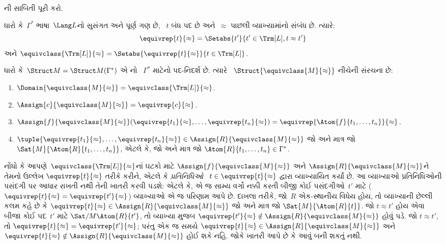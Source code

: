 
\begin{prob}
ની સાબિતી પૂરી કરો.
\end{prob}

\begin{defn}
ધારો કે~$\Gamma^*$ ભાષા~$\Lang L$નો સુસંગત અને પૂર્ણ ગણ છે,
~$t$ બંધ પદ છે અને~$\approx$ પાછલી વ્યાખ્યામાંનો સંબંધ છે. ત્યારે:
\[
\equivrep{t}{\approx}=\Setabs{t'}{t'\in\Trm[L],t\approx t'}
\]
અને
$\equivclass{\Trm[L]}{\approx}=\Setabs{\equivrep{t}{\approx}}{t\in\Trm[L]}$.
\end{defn}

\begin{defn}
ધારો કે~$\Struct M=\Struct M(\Gamma^*)$ એ નો
~$\Gamma^*$ માટેનો પદ-નિદર્શ છે. ત્યારે
~$\Struct{\equivclass{M}{\approx}}$ નીચેની સંરચના છે:
\begin{enumerate}
\item $\Domain{\equivclass{M}{\approx}}=\equivclass{\Trm[L]}{\approx}$.
\item $\Assign{c}{\equivclass{M}{\approx}}=\equivrep{c}{\approx}$.
\item $\Assign{f}{\equivclass{M}{\approx}}(\equivrep{t_1}{\approx},\dots,
  \equivrep{t_n}{\approx})=\equivrep{\Atom{f}{t_1,\dots,t_n}}{\approx}$.
\item $\tuple{\equivrep{t_1}{\approx},\dots,\equivrep{t_n}{\approx}}
  \in\Assign{R}{\equivclass{M}{\approx}}$ જો અને માત્ર જો
  $\Sat{M}{\Atom{R}{t_1,\dots,t_n}}$, એટલે કે, જો અને માત્ર જો
  $\Atom{R}{t_1,\dots,t_n}\in\Gamma^*$.
\end{enumerate}
\end{defn}

\begin{explain}
નોંધો કે આપણે~$\equivclass{\Trm[L]}{\approx}$નાં ઘટકો માટે
$\Assign{f}{\equivclass{M}{\approx}}$ અને
$\Assign{R}{\equivclass{M}{\approx}}$ને તેમનો ઉલ્લેખ
$\equivrep{t}{\approx}$ તરીકે કરીને, એટલે કે \emph{પ્રતિનિધિઓ}
~$t\in\equivrep{t}{\approx}$ દ્વારા વ્યાખ્યાયિત કર્યાં છે. આ વ્યાખ્યાઓ
પ્રતિનિધિઓની પસંદગી પર આધાર રાખતી નથી તેની ખાતરી કરવી પડશે: એટલે કે,
એ જ સામ્ય વર્ગો નક્કી કરતી બીજી કોઈ પસંદગીઓ~$t'$ માટે
($\equivrep{t}{\approx}=\equivrep{t'}{\approx}$) વ્યાખ્યાઓ એ જ પરિણામ
આપે છે. દાખલા તરીકે, જો~$R$ એક-સ્થાનીય વિધેય હોય, તો
વ્યાખ્યાની છેલ્લી કલમ કહે છે કે $\equivrep{t}{\approx}\in
\Assign{R}{\equivclass{M}{\approx}}$ જો અને માત્ર જો
$\Sat{M}{\Atom{R}{t}}$. જો $t\approx t'$ હોય એવા બીજા કોઈ પદ~$t'$ માટે
$\Sat/{M}{\Atom{R}{t'}}$, તો વ્યાખ્યા મુજબ
$\equivrep{t'}{\approx}\notin\Assign{R}{\equivclass{M}{\approx}}$ હોવું
પડે. જો $t\approx t'$, તો $\equivrep{t}{\approx}=
\equivrep{t'}{\approx}$; પરંતુ એક જ સમયે $\equivrep{t}{\approx}\in
\Assign{R}{\equivclass{M}{\approx}}$ અને $\equivrep{t}{\approx}\notin
\Assign{R}{\equivclass{M}{\approx}}$ હોઈ શકે નહિ. જોકે
 ખાતરી આપે છે કે આવું બની શકતું નથી.
\end{explain}

